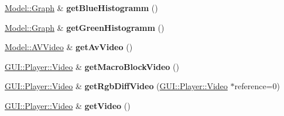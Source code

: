 \begin{DoxyCompactItemize}
\item 
\hypertarget{classModel_1_1EncodedVideo_a665006efad68684718c78c213e081f16}{}\hyperlink{classModel_1_1Graph}{Model\+::\+Graph} \& {\bfseries get\+Blue\+Histogramm} ()\label{classModel_1_1EncodedVideo_a665006efad68684718c78c213e081f16}

\item 
\hypertarget{classModel_1_1EncodedVideo_a85d21a1922c274ff928b8794627fc3f0}{}\hyperlink{classModel_1_1Graph}{Model\+::\+Graph} \& {\bfseries get\+Green\+Histogramm} ()\label{classModel_1_1EncodedVideo_a85d21a1922c274ff928b8794627fc3f0}

\item 
\hypertarget{classModel_1_1EncodedVideo_a58bd43e5cbaa711bf19b0c71efbc9834}{}\hyperlink{classModel_1_1AVVideo}{Model\+::\+A\+V\+Video} \& {\bfseries get\+Av\+Video} ()\label{classModel_1_1EncodedVideo_a58bd43e5cbaa711bf19b0c71efbc9834}

\item 
\hypertarget{classModel_1_1EncodedVideo_a8efa1486dd7b968e9b0f1cb5be919381}{}\hyperlink{classGUI_1_1Player_1_1Video}{G\+U\+I\+::\+Player\+::\+Video} \& {\bfseries get\+Macro\+Block\+Video} ()\label{classModel_1_1EncodedVideo_a8efa1486dd7b968e9b0f1cb5be919381}

\item 
\hypertarget{classModel_1_1EncodedVideo_a85eb47f3e866632f0e48c89becc72d1a}{}\hyperlink{classGUI_1_1Player_1_1Video}{G\+U\+I\+::\+Player\+::\+Video} \& {\bfseries get\+Rgb\+Diff\+Video} (\hyperlink{classGUI_1_1Player_1_1Video}{G\+U\+I\+::\+Player\+::\+Video} $\ast$reference=0)\label{classModel_1_1EncodedVideo_a85eb47f3e866632f0e48c89becc72d1a}

\item 
\hypertarget{classModel_1_1EncodedVideo_a56ebcfcff7dfad1f4b9e302794451afe}{}\hyperlink{classGUI_1_1Player_1_1Video}{G\+U\+I\+::\+Player\+::\+Video} \& {\bfseries get\+Video} ()\label{classModel_1_1EncodedVideo_a56ebcfcff7dfad1f4b9e302794451afe}

\end{DoxyCompactItemize}
